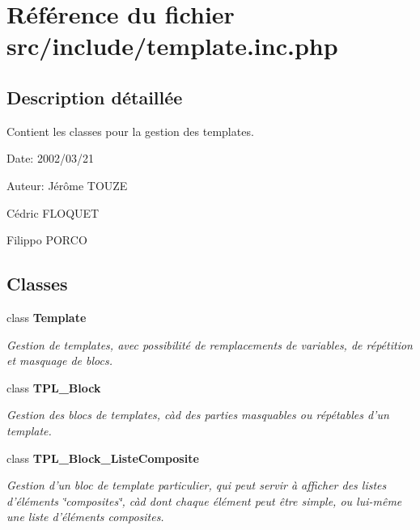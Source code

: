 \section{Référence du fichier src/include/template.inc.php}
\label{template_8inc_8php}


\subsection{Description détaillée}
Contient les classes pour la gestion des templates. 

\begin{Desc}
\item[Date:]2002/03/21\end{Desc}
\begin{Desc}
\item[Auteur:]Jérôme TOUZE 

Cédric FLOQUET 

Filippo PORCO \end{Desc}


\subsection*{Classes}
\begin{CompactItemize}
\item 
class {\bf Template}
\begin{CompactList}\small\item\em Gestion de templates, avec possibilité de remplacements de variables, de répétition et masquage de blocs. \item\end{CompactList}\item 
class {\bf TPL\_\-Block}
\begin{CompactList}\small\item\em Gestion des blocs de templates, càd des parties masquables ou répétables d'un template. \item\end{CompactList}\item 
class {\bf TPL\_\-Block\_\-ListeComposite}
\begin{CompactList}\small\item\em Gestion d'un bloc de template particulier, qui peut servir à afficher des listes d'éléments \char`\"{}composites\char`\"{}, càd dont chaque élément peut être simple, ou lui-même une liste d'éléments composites. \item\end{CompactList}\end{CompactItemize}
